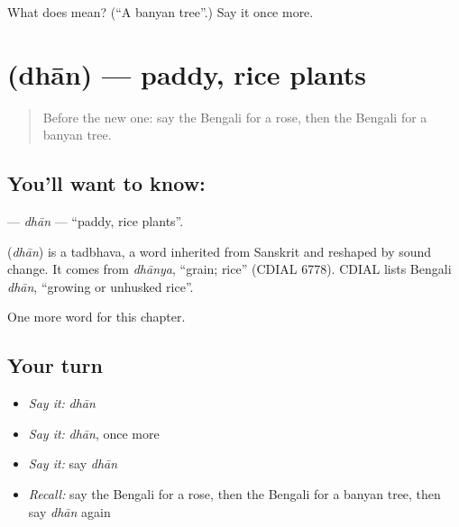 \begin{tcolorbox}[breakable,colback=teal!4,colframe=teal!35!black,title={Before you move on}]
What does  mean? (\textquotedblleft{}A banyan tree\textquotedblright{}.) Say it once more.
\end{tcolorbox}
\section[\texorpdfstring{\bn{ধান} (dhān)}{ধান (dhān)}]{ (dhān) — paddy, rice plants}

\label{lesson:BN-C171-dhan}



\begin{quote}
Before the new one: say the Bengali for a rose, then the Bengali for a banyan tree.
\end{quote}

\subsection*{You'll want to know: }
\textbf{} — \emph{dhān} — \textquotedblleft{}paddy, rice plants\textquotedblright{}.

\begin{cousinweb}
\textbf{} (\emph{dhān}) is a tadbhava, a word inherited from Sanskrit and reshaped by sound change. It comes from \emph{dhānya}, \textquotedblleft{}grain; rice\textquotedblright{} (CDIAL 6778). CDIAL lists Bengali \emph{dhān}, \textquotedblleft{}growing or unhusked rice\textquotedblright{}.
\end{cousinweb}

\begin{grammarlens}[title={What you've built}]
One more word for this chapter.
\end{grammarlens}

\subsection*{Your turn}
\begin{itemize}
\raggedright
  \item \emph{Say it:} \emph{dhān}
  \item \emph{Say it:} \emph{dhān}, once more
  \item \emph{Say it:} say \emph{dhān}
  \item \emph{Recall:} say the Bengali for a rose, then the Bengali for a banyan tree, then say \emph{dhān} again
\end{itemize}


